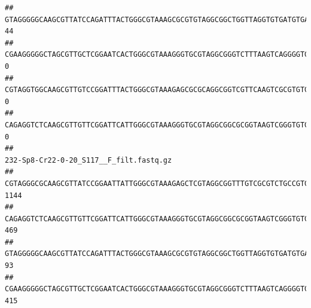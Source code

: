 \documentclass[]{article}
\begin{document}
\begin{verbatim}
## GTAGGGGGCAAGCGTTATCCAGATTTACTGGGCGTAAAGCGCGTGTAGGCGGCTGGTTAGGTGTGATGTGAAATCTTCCGGCTCAACCGGAAAACTGCATTGCAAACCGGCCTGGCTAGAGTGCAGGAGAGGGAAGCGGAATTCCAGGTGTAGCGGTGAAATGCGTAGATATCTGGAGGAACACCAGTGGCGAAGGCGGCTTCCTGGCCTGCAACTGACGCTGAGACGCGAAAGCGTGGGGAGCGAAC                                       44
## CGAAGGGGGCTAGCGTTGCTCGGAATCACTGGGCGTAAAGGGTGCGTAGGCGGGTCTTTAAGTCAGGGGTGAAATCCTGGAGCTCAACTCCAGAACTGCCTTTGATACTGAAGATCTTGAGTTCGGGAGAGGTGAGTGGAACTGCGAGTGTAGAGGTGAAATTCGTAGATATTCGCAAGAACACCAGTGGCGAAGGCGGCTCACTGGCCCGATACTGACGCTGAGGCACGAAAGCGTGGGGAGCAAACA                                       0
## CGTAGGTGGCAAGCGTTGTCCGGATTTACTGGGCGTAAAGAGCGCGCAGGCGGTCGTTCAAGTCGCGTGTGAAAGCCCCCGGCTCAACTGGGGAGGGTCACGCGATACTGATCGACTCGAAGGCAGGAGAGGGTAGTGGAATTCCCGGTGTAGTGGTGAAATGCGTAGATATCGGGAGGAACACCAGTGGCGAAGGCGACTACCTGGCCTGTTCTTGACGCTGAGGCGCGAAAGCTAGGGGAGCAAACG                                       0
## CAGAGGTCTCAAGCGTTGTTCGGATTCATTGGGCGTAAAGGGTGCGTAGGCGGCGCGGTAAGTCGGGTGTGAAATCTCGGGGCTTAACTCCGAAACTGCATTCGATACTGCCGTGCTTGAGGACTGGAGAGGAGACTGGAATTTACGGTGTAGCGGTGAAATGCGTAGATATCGTAAGGAAGACCAGTGGCGAAGGCGGGTCTCTGGACAGTTCCTGACGCTGAGGCACGAAGGCCAGGGGAGCAAACG                                       0
##                                                                                                                                                                                                                                                           232-Sp8-Cr22-0-20_S117__F_filt.fastq.gz
## CGTAGGGCGCAAGCGTTATCCGGAATTATTGGGCGTAAAGAGCTCGTAGGCGGTTTGTCGCGTCTGCCGTGAAAGTCCGGGGCTCAACTCCGGATCTGCGGTGGGTACGGGCAGACTAGAGTGATGTAGGGGAGACTGGAATTCCTGGTGTAGCGGTGAAATGCGCAGATATCAGGAGGAACACCGATGGCGAAGGCAGGTCTCTGGGCATTAACTGACGCTGAGGAGCGAAAGCATGGGGAGCGAACA                                    1144
## CAGAGGTCTCAAGCGTTGTTCGGATTCATTGGGCGTAAAGGGTGCGTAGGCGGCGCGGTAAGTCGGGTGTGAAATCTCGGAGCTTAACTCCGAAACTGCATTCGATACTGCCGTGCTTGAGGACTGGAGAGGAGACTGGAATTTACGGTGTAGCGGTGAAATGCGTAGATATCGTAAGGAAGACCAGTGGCGAAGGCGGGTCTCTGGACAGTTCCTGACGCTGAGGCACGAAGGCCAGGGGAGCAAACG                                     469
## GTAGGGGGCAAGCGTTATCCAGATTTACTGGGCGTAAAGCGCGTGTAGGCGGCTGGTTAGGTGTGATGTGAAATCTTCCGGCTCAACCGGAAAACTGCATTGCAAACCGGCCTGGCTAGAGTGCAGGAGAGGGAAGCGGAATTCCAGGTGTAGCGGTGAAATGCGTAGATATCTGGAGGAACACCAGTGGCGAAGGCGGCTTCCTGGCCTGCAACTGACGCTGAGACGCGAAAGCGTGGGGAGCGAAC                                       93
## CGAAGGGGGCTAGCGTTGCTCGGAATCACTGGGCGTAAAGGGTGCGTAGGCGGGTCTTTAAGTCAGGGGTGAAATCCTGGAGCTCAACTCCAGAACTGCCTTTGATACTGAAGATCTTGAGTTCGGGAGAGGTGAGTGGAACTGCGAGTGTAGAGGTGAAATTCGTAGATATTCGCAAGAACACCAGTGGCGAAGGCGGCTCACTGGCCCGATACTGACGCTGAGGCACGAAAGCGTGGGGAGCAAACA                                     415

\end{verbatim}
\end{document}
